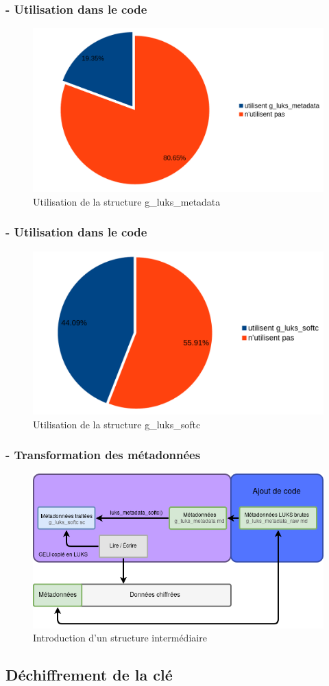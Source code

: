 \begin{frame}
	\frametitle{\insertsubsectionhead - Utilisation dans le code}
	\begin{figure}
		\includegraphics[width=.8\textwidth]{developpement/fonctions_g_luks_metadata}
		\caption{Utilisation de la structure g\_luks\_metadata}
	\end{figure}
\end{frame}
\begin{frame}
	\frametitle{\insertsubsectionhead - Utilisation dans le code}
	\begin{figure}
		\includegraphics[width=.8\textwidth]{developpement/fonctions_g_luks_softc}
		\caption{Utilisation de la structure g\_luks\_softc}
	\end{figure}
\end{frame}

\begin{frame}
	\frametitle{\insertsubsectionhead - Transformation des métadonnées}
	\begin{figure}
		\includegraphics[width=\textwidth]{developpement/utilisation_metadonnee_luks}
		\caption{Introduction d'un structure intermédiaire}
	\end{figure}
\end{frame}

\subsection{Déchiffrement de la clé}

\begin{frame}
	\frametitle{\insertsubsectionhead}
\end{frame}	
